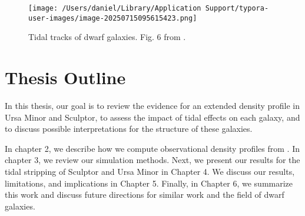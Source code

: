 \begin{figure}
\centering
\texttt{[image: /Users/daniel/Library/Application Support/typora-user-images/image-20250715095615423.png]}
\caption[Tidal tracks of dwarf galaxies]{Tidal tracks of dwarf galaxies.
Fig. 6 from \citet{EN2021}.}\label{fig:tidal_tracks}
\end{figure}

\section{Thesis Outline}\label{thesis-outline}

In this thesis, our goal is to review the evidence for an extended
density profile in Ursa Minor and Sculptor, to assess the impact of
tidal effects on each galaxy, and to discuss possible interpretations
for the structure of these galaxies.

In chapter 2, we describe how we compute observational density profiles
from \citet{jensen+2024}. In chapter 3, we review our simulation
methods. Next, we present our results for the tidal stripping of
Sculptor and Ursa Minor in Chapter 4. We discuss our results,
limitations, and implications in Chapter 5. Finally, in Chapter 6, we
summarize this work and discuss future directions for similar work and
the field of dwarf galaxies.
